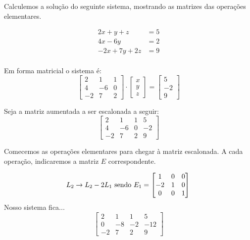 \documentclass[12pt]{article}
\begin{document}
Calculemos a solução do seguinte sistema, mostrando as matrizes das operações elementares.

\begin{align*}
	2x+y+z&=5\\4x-6y&=2\\-2x+7y+2z&=9
\end{align*}\\

Em forma matricial o sistema é: \\

\begin{equation*}
	\begin{bmatrix}
		2 & 1 & 1\\
		4 & -6 & 0\\
		-2 & 7 & 2
	\end{bmatrix} \cdot
	\begin{bmatrix}
		x\\ y\\z
	\end{bmatrix} =
	\begin{bmatrix}
		5 \\ -2\\9
	\end{bmatrix}
\end{equation*}


Seja a matriz aumentada a ser escalonada a seguir: 
\begin{equation*}
	\begin{bmatrix}
		2 & 1 & 1 & 5\\
		4 & -6 & 0 & -2\\
		-2 & 7 & 2 & 9
	\end{bmatrix}
\end{equation*}

Comecemos as operações elementares para chegar à matriz escalonada. A cada operação, indicaremos a matriz $E$ correspondente.

\begin{equation*}
	L_2 \rightarrow L_2 -2L_1 \mbox{ sendo } 
	E_1=\begin{bmatrix}
		1 & 0 &0\\
		-2 & 1 & 0\\
		0 & 0 & 1
	\end{bmatrix}\\
\end{equation*}
Nosso sistema fica...
\begin{equation*}
	\begin{bmatrix}
		2 & 1 & 1 & 5\\
		0 & -8 & -2 & -12\\
		-2 & 7 & 2 & 9
	\end{bmatrix}
\end{equation*}\\
\end{document}

